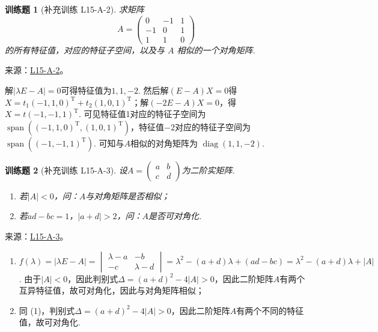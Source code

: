 \documentclass[UTF8,12pt,a4paper,fontset=fandol]{ctexart}
\newtheorem{exercise}{训练题}[section]
\begin{document}
\begin{exercise}[补充训练 L15-A-2]\label{prob:L15-A-2}
求矩阵
        \[A = \begin{pmatrix}
                0  & -1 & 1 \\
                -1 & 0  & 1 \\
                1  & 1  & 0
            \end{pmatrix}\]
        的所有特征值，对应的特征子空间，以及与 $A$ 相似的一个对角矩阵.
\end{exercise}
\noindent 来源：\href{https://github.com/yhwu-is/Linear-Algebra-Left-Undone/blob/new/%E8%AE%B2%E4%B9%89/%E4%B8%93%E9%A2%98/15%20%E7%9B%B8%E4%BC%BC%E6%A0%87%E5%87%86%E5%BD%A2%EF%BC%9A%E5%A4%8D%E6%95%B0%E5%9F%9F%E4%B8%8A%E7%9A%84%E5%B0%9D%E8%AF%95%E4%B8%8E%E7%90%86%E8%AE%BA.tex}{L15-A-2}。
\begin{solve}
解$|\lambda E-A|=0$可得特征值为$1,1,-2$. 然后解$(E-A)X=0$得$X=t_1(-1,1,0)^\mathrm{T}+t_2(1,0,1)^\mathrm{T}$；解$(-2E-A)X=0$，得$X=t(-1,-1,1)^\mathrm{T}$. 可见特征值1对应的特征子空间为$\operatorname{span}((-1,1,0)^\mathrm{T},(1,0,1)^\mathrm{T})$，特征值$-2$对应的特征子空间为 $\operatorname{span}((-1,-1,1)^\mathrm{T})$. 可知与$A$相似的对角矩阵为 $\operatorname{diag}(1,1,-2)$.
\end{solve}

\begin{exercise}[补充训练 L15-A-3]\label{prob:L15-A-3}
设$A=\begin{pmatrix}
                a & b \\ c & d
            \end{pmatrix}$为二阶实矩阵.
        \begin{enumerate}
            \item 若$|A|<0$，问：$A$与对角矩阵是否相似；

            \item 若$ad-bc=1$，$|a+d|>2$，问：$A$是否可对角化.
        \end{enumerate}
\end{exercise}
\noindent 来源：\href{https://github.com/yhwu-is/Linear-Algebra-Left-Undone/blob/new/%E8%AE%B2%E4%B9%89/%E4%B8%93%E9%A2%98/15%20%E7%9B%B8%E4%BC%BC%E6%A0%87%E5%87%86%E5%BD%A2%EF%BC%9A%E5%A4%8D%E6%95%B0%E5%9F%9F%E4%B8%8A%E7%9A%84%E5%B0%9D%E8%AF%95%E4%B8%8E%E7%90%86%E8%AE%BA.tex}{L15-A-3}。
\begin{solve}
\begin{enumerate}
                \item $f(\lambda)=|\lambda E-A|=\begin{vmatrix}
                              \lambda-a & -b \\ -c & \lambda-d
                          \end{vmatrix}=\lambda^2-(a+d)\lambda+(ad-bc)=\lambda^2-(a+d)\lambda+|A|$. 由于$|A|<0$，因此判别式$\Delta=(a+d)^2-4|A|>0$，因此二阶矩阵$A$有两个互异特征值，故可对角化，因此与对角矩阵相似；

                \item 同 (1)，判别式$\Delta=(a+d)^2-4|A|>0$，因此二阶矩阵$A$有两个不同的特征值，故可对角化.
            \end{enumerate}
\end{solve}
\end{document}
